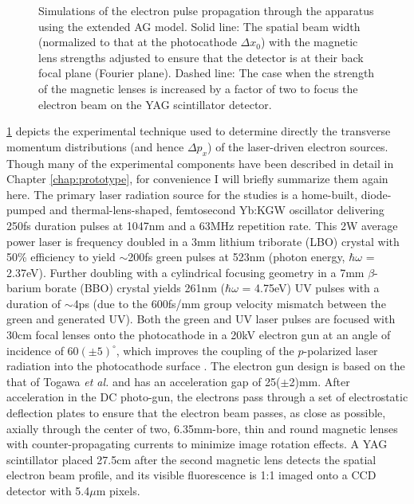 \begin{figure}
  \centering
  
  \caption[Beam profile simulation of experimental setup]{
    Simulations of the electron pulse propagation through the apparatus using the extended AG model.  
    Solid line: The spatial beam width (normalized to that at the photocathode $\Delta x_0$) with the magnetic lens strengths adjusted to ensure that the detector is at their back focal plane (Fourier plane).
    Dashed line: The case when the strength of the magnetic lenses is increased by a factor of two to focus the electron beam on the YAG scintillator detector.
  }
  \label{fig:transverse-measurement}
\end{figure}

\ref{fig:transverse-measurement} depicts the experimental technique used to determine directly the transverse momentum distributions (and hence $\Delta p_x$) of the laser-driven electron sources.
Though many of the experimental components have been described in detail in Chapter \ref{chap:prototype}, for convenience I will briefly summarize them again here.
The primary laser radiation source for the studies is a home-built, diode-pumped and thermal-lens-shaped, femtosecond Yb:KGW oscillator \cite{berger_high-power_2008} delivering 250fs duration pulses at 1047nm and a 63MHz repetition rate.
This 2W average power laser is frequency doubled in a 3mm lithium triborate (LBO) crystal with 50\% efficiency to yield $\sim$200fs green pulses at 523nm (photon energy, $\hbar \omega$ = 2.37eV).
Further doubling with a cylindrical focusing geometry in a 7mm $\beta$-barium borate (BBO) crystal yields 261nm ($\hbar \omega$ = 4.75eV) UV pulses with a duration of $\sim$4ps (due to the 600fs/mm group velocity mismatch between the green and generated UV).
Both the green and UV laser pulses are focused with 30cm focal lenses onto the photocathode in a 20kV electron gun at an angle of incidence of $60(\pm5)^{\circ}$, which improves the coupling of the $p$-polarized laser radiation into the photocathode surface \cite{berger_dc_2009}.
The electron gun design is based on the that of Togawa \textit{et al.} \cite{berger_dc_2009,togawa_ceb6_2007} and has an acceleration gap of 25($\pm$2)mm.
After acceleration in the DC photo-gun, the electrons pass through a set of electrostatic deflection plates to ensure that the electron beam passes, as close as possible, axially through the center of two, 6.35mm-bore, thin and round magnetic lenses with counter-propagating currents to minimize image rotation effects.
A YAG scintillator placed 27.5cm after the second magnetic lens detects the spatial electron beam profile, and its visible fluorescence is 1:1 imaged onto a CCD detector with 5.4$\mu$m pixels. 

